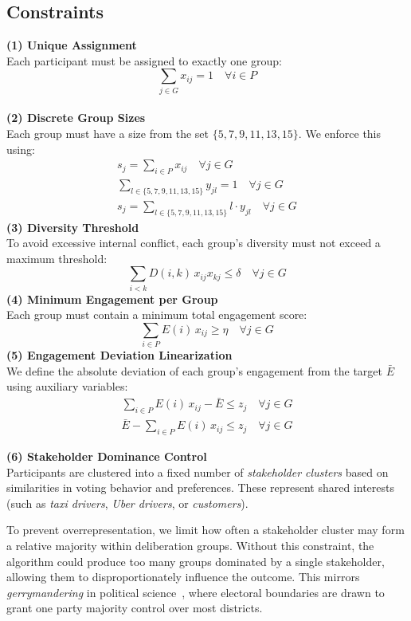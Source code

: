\subsection*{Constraints}
\textbf{(1) Unique Assignment}\\[3pt]
Each participant must be assigned to exactly one group:
\[
\sum_{j \in G} x_{ij} = 1 \quad \forall i \in P
\]
\\
\textbf{(2) Discrete Group Sizes}\\[3pt]
Each group must have a size from the set \(\{5,7,9,11,13,15\}\).
We enforce this using:
\begin{gather*}
    s_j = \sum_{i \in P} x_{ij} \quad \forall j \in G\\
    \sum_{l \in \{5,7,9,11,13,15\}} y_{jl} = 1 \quad \forall j \in G\\
    s_j = \sum_{l \in \{5,7,9,11,13,15\}} l \cdot y_{jl} \quad \forall j \in G
\end{gather*}
\textbf{(3) Diversity Threshold}\\[3pt]
To avoid excessive internal conflict, each group's diversity must not exceed a maximum threshold:
\[
\sum_{i < k} D(i,k)\,x_{ij} x_{kj} \leq \delta \quad \forall j \in G
\]
\textbf{(4) Minimum Engagement per Group}\\[3pt]
Each group must contain a minimum total engagement score:
\[
\sum_{i \in P} E(i)\,x_{ij} \geq \eta \quad \forall j \in G
\]
\textbf{(5) Engagement Deviation Linearization}\\[3pt]
We define the absolute deviation of each group's engagement from the target \(\bar{E}\) using auxiliary variables:
\begin{gather*}
    \sum_{i \in P} E(i)\,x_{ij} - \bar{E} \leq z_j \quad \forall j \in G\\
    \bar{E} - \sum_{i \in P} E(i)\,x_{ij} \leq z_j \quad \forall j \in G
\end{gather*}

\textbf{(6) Stakeholder Dominance Control}\\[3pt]
Participants are clustered into a fixed number of \emph{stakeholder clusters}
based on similarities in voting behavior and preferences.
These represent shared interests (such as \textit{taxi drivers}, \textit{Uber drivers}, or \textit{customers}).

To prevent overrepresentation, we limit how often
a stakeholder cluster may form a relative majority within deliberation groups.
Without this constraint, the algorithm could produce too many groups dominated by a single stakeholder,
allowing them to disproportionately influence the outcome.
This mirrors \emph{gerrymandering} in political science~\parencite{gerrymandering2019},
where electoral boundaries are drawn to grant one party majority control over most districts.

